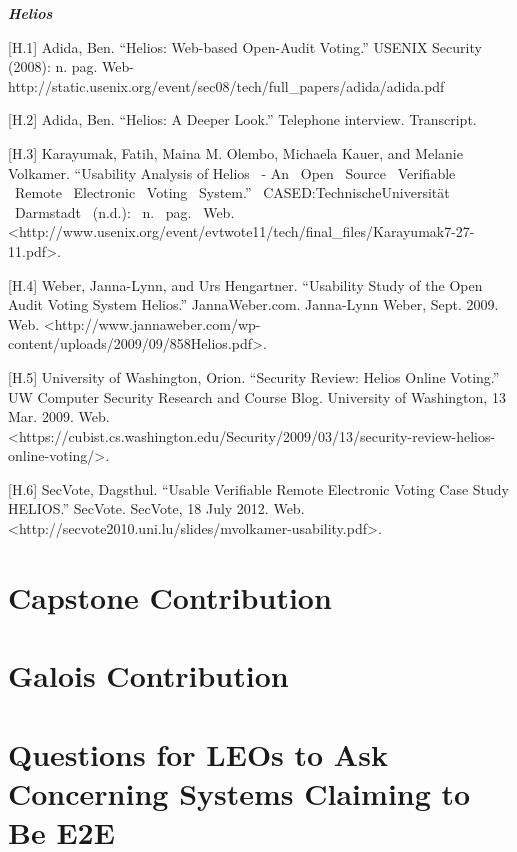 \bigskip


\bigskip

\textbf{\textit{Helios}}

[H.1] Adida, Ben. ``Helios: Web-based Open-Audit Voting.'' USENIX Security (2008): n. pag. Web- \textcolor[rgb]{0.078431375,0.3254902,0.6901961}{http://static.usenix.org/event/sec08/tech/full\_papers/adida/adida.pdf}

[H.2] Adida, Ben. ``Helios: A Deeper Look.'' Telephone interview. Transcript.

[H.3] Karayumak, Fatih, Maina M. Olembo, Michaela Kauer, and Melanie Volkamer. ``Usability Analysis of Helios ~- An ~Open ~Source ~Verifiable ~Remote ~Electronic ~Voting ~System.'' ~CASED:TechnischeUniversität ~Darmstadt ~(n.d.): ~n. ~pag. ~Web. ~ {\textless}http://www.usenix.org/event/evtwote11/tech/final\_files/Karayumak7-27-11.pdf{\textgreater}.

[H.4] Weber, Janna-Lynn, and Urs Hengartner. ``Usability Study of the Open Audit Voting System Helios.'' JannaWeber.com. Janna-Lynn Weber, Sept. 2009. Web. {\textless}http://www.jannaweber.com/wp- \textcolor[rgb]{0.078431375,0.3254902,0.6901961}{content/uploads/2009/09/858Helios.pdf{\textgreater}.}

[H.5] University of Washington, Orion. ``Security Review: Helios Online Voting.'' UW Computer Security Research and Course Blog. University of Washington, 13 Mar. 2009. Web. {\textless}https://cubist.cs.washington.edu/Security/2009/03/13/security-review-helios-online-voting/{\textgreater}.

[H.6] SecVote, Dagsthul. ``Usable Verifiable Remote Electronic Voting Case Study HELIOS.'' SecVote. SecVote, 18 July 2012. Web. {\textless}http://secvote2010.uni.lu/slides/mvolkamer-usability.pdf{\textgreater}.

\section{Capstone Contribution}


\section{Galois Contribution}

\section{Questions for LEOs to Ask Concerning Systems Claiming to Be E2E}
